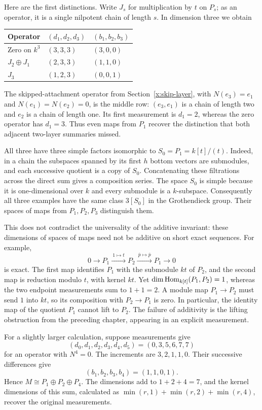 Here are the first distinctions. Write $J_s$ for multiplication by $t$ on
$P_s$; as an operator, it is a single nilpotent chain of length $s$.
In dimension three we obtain
\begin{center}
\begin{tabular}{@{}lll@{}}
\toprule
Operator & $(d_1,d_2,d_3)$ & $(b_1,b_2,b_3)$ \\
\midrule
Zero on $k^3$ & $(3,3,3)$ & $(3,0,0)$ \\
$J_2\oplus J_1$ & $(2,3,3)$ & $(1,1,0)$ \\
$J_3$ & $(1,2,3)$ & $(0,0,1)$ \\
\bottomrule
\end{tabular}
\end{center}
The skipped-attachment operator from Section~\ref{x:skip-layer},
with $N(e_3)=e_1$ and $N(e_1)=N(e_2)=0$, is the middle row:
$(e_3,e_1)$ is a chain of length two and $e_2$ is a chain of length one.
Its first measurement is $d_1=2$, whereas the zero operator has $d_1=3$.
Thus even maps from $P_1$ recover the distinction that both adjacent
two-layer summaries missed.

All three have three simple factors isomorphic to
$S_0=P_1=k[t]/(t)$. Indeed, in a chain the subspaces spanned by its first
$h$ bottom vectors are submodules, and each successive quotient is a copy
of $S_0$. Concatenating these filtrations across the direct sum gives a
composition series. The space $S_0$ is simple because it is
one-dimensional over $k$ and every submodule is a $k$-subspace.
Consequently all three examples have the same class $3[S_0]$ in the
Grothendieck group. Their spaces of maps from $P_1,P_2,P_3$ distinguish them.

This does not contradict the universality of the additive invariant:
these dimensions of spaces of maps need not be additive on short exact
sequences. For example,
\[
 0\longrightarrow P_1\xrightarrow{\ 1\mapsto t\ }P_2
 \xrightarrow{\ \overline p\mapsto\overline p\ }P_1
 \longrightarrow0
\]
is exact. The first map identifies $P_1$ with the submodule $kt$ of
$P_2$, and the second map is reduction modulo $t$, with kernel $kt$.
Yet $\dim\operatorname{Hom}_{k[t]}(P_1,P_2)=1$, whereas the two endpoint measurements
sum to $1+1=2$. A module map $P_1\to P_2$ must send $1$ into $kt$, so its
composition with $P_2\to P_1$ is zero. In particular, the identity map
of the quotient $P_1$ cannot lift to $P_2$. The failure of additivity is
the lifting obstruction from the preceding chapter, appearing in an
explicit measurement.

For a slightly larger calculation, suppose measurements give
\[
 (d_0,d_1,d_2,d_3,d_4,d_5)=(0,3,5,6,7,7)
\]
for an operator with $N^4=0$. The increments are
$3,2,1,1,0$. Their successive differences give
\[
 (b_1,b_2,b_3,b_4)=(1,1,0,1).
\]
Hence $M\cong P_1\oplus P_2\oplus P_4$. The dimensions add to
$1+2+4=7$, and the kernel dimensions of this sum, calculated as
$\min(r,1)+\min(r,2)+\min(r,4)$, recover the original measurements.

